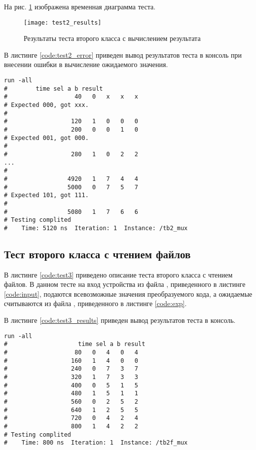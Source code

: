 На рис. \ref{fig:test2_results} изображена временная диаграмма теста.
\begin{figure}[H]
	\begin{center}
		\texttt{[image: test2\_results]}
		\caption{Результаты теста второго класса с вычислением результата}
		\label{fig:test2_results}
	\end{center}
\end{figure}
\vspace{-1cm}

В листинге \ref{code:test2_error} приведен вывод результатов теста в консоль при внесении ошибки в вычисление ожидаемого значения.	
\begin{lstlisting}[caption=Результаты ошибочного теста второго класса с вычислением результата, label=code:test2_error, style=console]
run -all
# 		 time sel a b result
#                   40   0   x   x   x
# Expected 000, got xxx.
# 
#                  120   1   0   0   0
#                  200   0   0   1   0
# Expected 001, got 000.
# 
#                  280   1   0   2   2
...
# 
#                 4920   1   7   4   4
#                 5000   0   7   5   7
# Expected 101, got 111.
# 
#                 5080   1   7   6   6
# Testing complited
#    Time: 5120 ns  Iteration: 1  Instance: /tb2_mux
\end{lstlisting}

\subsection{Тест второго класса с чтением файлов}

В листинге \ref{code:test3} приведено описание теста второго класса с чтением файлов. В данном тесте на вход устройства из файла , приведенного в листинге \ref{code:input}, подаются всевозможные значения преобразуемого кода, а ожидаемые считываются из файла , приведенного в листинге \ref{code:exp}. 

	


В листинге \ref{code:test3_results} приведен вывод результатов теста в консоль.
\begin{lstlisting}[caption=Результаты теста второго класса с чтением файлов, label=code:test3_results, style=console]
run -all
# 		             time sel a b result
#                   80   0   4   0   4
#                  160   1   4   0   0
#                  240   0   7   3   7
#                  320   1   7   3   3
#                  400   0   5   1   5
#                  480   1   5   1   1
#                  560   0   2   5   2
#                  640   1   2   5   5
#                  720   0   4   2   4
#                  800   1   4   2   2
# Testing complited
#    Time: 800 ns  Iteration: 1  Instance: /tb2f_mux
\end{lstlisting}

